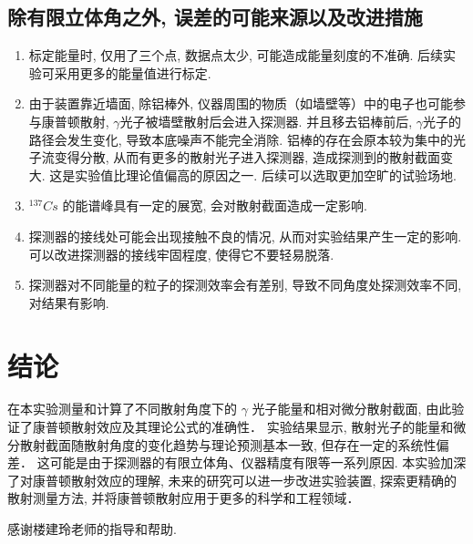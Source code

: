 \documentclass[font=default]{mpltx}
\begin{document}
      \subsection{除有限立体角之外, 误差的可能来源以及改进措施}

      \begin{enumerate}
        \item 标定能量时, 仅用了三个点, 数据点太少, 可能造成能量刻度的不准确. 后续实验可采用更多的能量值进行标定. 
        \item 由于装置靠近墙面, 除铝棒外, 仪器周围的物质（如墙壁等）中的电子也可能参与康普顿散射, $\gamma$光子被墙壁散射后会进入探测器. 
        并且移去铝棒前后, $\gamma$光子的路径会发生变化, 导致本底噪声不能完全消除. 铝棒的存在会原本较为集中的光子流变得分散, 
        从而有更多的散射光子进入探测器, 造成探测到的散射截面变大. 这是实验值比理论值偏高的原因之一. 后续可以选取更加空旷的试验场地. 
        \item $^{137} Cs$ 的能谱峰具有一定的展宽, 会对散射截面造成一定影响.
        \item 探测器的接线处可能会出现接触不良的情况, 从而对实验结果产生一定的影响. 可以改进探测器的接线牢固程度, 使得它不要轻易脱落. 
        \item 探测器对不同能量的粒子的探测效率会有差别, 导致不同角度处探测效率不同, 对结果有影响. 
      \end{enumerate}
	


\section{结论}
	在本实验测量和计算了不同散射角度下的 $\gamma$ 光子能量和相对微分散射截面, 由此验证了康普顿散射效应及其理论公式的准确性．
	实验结果显示, 散射光子的能量和微分散射截面随散射角度的变化趋势与理论预测基本一致, 但存在一定的系统性偏差．
	这可能是由于探测器的有限立体角、仪器精度有限等一系列原因. 
	本实验加深了对康普顿散射效应的理解, 未来的研究可以进一步改进实验装置, 探索更精确的散射测量方法, 并将康普顿散射应用于更多的科学和工程领域．
	
\begin{acknowledgments}
  感谢楼建玲老师的指导和帮助.
\end{acknowledgments}


\end{document}

